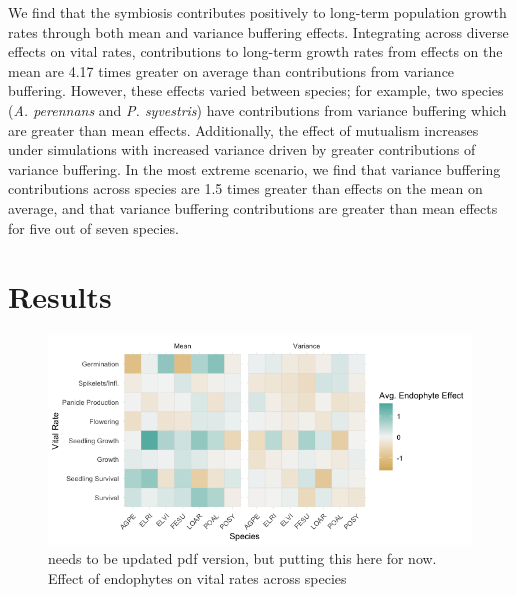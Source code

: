 \documentclass[9pt,twocolumn,twoside,lineno]{pnas-new}
\begin{document}
We find that the symbiosis contributes positively to long-term population growth rates through both mean and variance buffering effects. Integrating across diverse effects on vital rates, contributions to long-term growth rates from effects on the mean are 4.17 times greater on average than contributions from variance buffering. However, these effects varied between species; for example, two species (\emph{A. perennans} and \emph{P. syvestris}) have contributions from variance buffering which are greater than mean effects. Additionally, the effect of mutualism increases under simulations with increased variance driven by greater contributions of variance buffering. In the most extreme scenario, we find that variance buffering contributions across species are 1.5 times greater than effects on the mean on average, and that variance buffering contributions are greater than mean effects for five out of seven species.

\section*{Results}
\begin{figure}%
\centering
\includegraphics[width=.8\linewidth]{meanvar_effect_heatmap}
\caption{needs to be updated pdf version, but putting this here for now. Effect of endophytes on vital rates across species}
\label{fig:vr_figure}
\end{figure}
\end{document}
